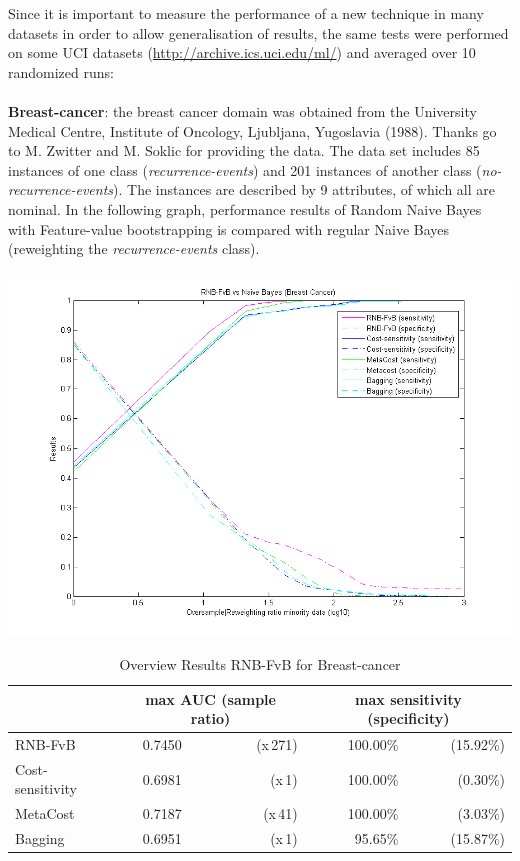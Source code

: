 \newpage
Since it is important to measure the performance of a new technique in many datasets in order to allow generalisation of results, the same tests were performed on some UCI datasets (\url{http://archive.ics.uci.edu/ml/}) and averaged over 10 randomized runs:\\\\
\textbf{Breast-cancer}: the breast cancer domain was obtained from the University Medical Centre, Institute of Oncology, Ljubljana, Yugoslavia (1988). Thanks go to M. Zwitter and M. Soklic for providing the data. The data set includes 85 instances of one class (\textit{recurrence-events}) and 201 instances of another class (\textit{no-recurrence-events}). The instances are described by 9 attributes, of which all are nominal. In the following graph, performance results of Random Naive Bayes with Feature-value bootstrapping is compared with regular Naive Bayes (reweighting the \textit{recurrence-events} class).

\includegraphics[scale=0.65]{img/RNB-FvB-breastcancer.png}

\begin{table}[h]
\centering  
\begin{tabular}{ l | c r | r r|}                                      
& \multicolumn{2}{c}{max AUC (sample ratio)} & \multicolumn{2}{c}{max sensitivity (specificity)} \\
\hline 
RNB-FvB & 0.7450 & (x\,271) & 100.00\% & (15.92\%)\\
Cost-sensitivity & 0.6981 & (x\,1) & 100.00\% & (0.30\%)\\
MetaCost & 0.7187 & (x\,41) & 100.00\% & (3.03\%)\\
Bagging & 0.6951 & (x\,1) & 95.65\% & (15.87\%)\\
\hline                          %
\end{tabular}
\label{tab:PPer}
\caption{Overview Results RNB-FvB for Breast-cancer} %
\end{table}



